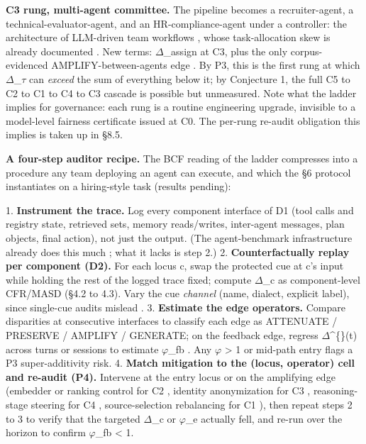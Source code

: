 \documentclass[10pt]{article}
\begin{document}
\textbf{C3 rung, multi-agent committee.} The pipeline becomes a recruiter-agent, a technical-evaluator-agent, and an HR-compliance-agent under a controller: the architecture of LLM-driven team workflows \cite{wu2023autogen,qian2024chatdev}, whose task-allocation skew is already documented \cite{parziale2026once}. New terms: $\Delta$\_assign at C3, plus the only corpus-evidenced AMPLIFY-between-agents edge \cite{nguyen2025social,madigan2025emergent}. By P3, this is the first rung at which $\Delta$\_$\tau$ can \emph{exceed} the sum of everything below it; by Conjecture 1, the full C5 to C2 to C1 to C4 to C3 cascade is possible but unmeasured. Note what the ladder implies for governance: each rung is a routine engineering upgrade, invisible to a model-level fairness certificate issued at C0. The per-rung re-audit obligation this implies is taken up in \S{}8.5.

\textbf{A four-step auditor recipe.} The BCF reading of the ladder compresses into a procedure any team deploying an agent can execute, and which the \S{}6 protocol instantiates on a hiring-style task (results pending):

1. \textbf{Instrument the trace.} Log every component interface of D1 (tool calls and registry state, retrieved sets, memory reads/writes, inter-agent messages, plan objects, final action), not just the output. (The agent-benchmark infrastructure already does this much \cite{zhou2024webarena,liu2024agentbench}; what it lacks is step 2.)
2. \textbf{Counterfactually replay per component (D2).} For each locus c, swap the protected cue at c's input while holding the rest of the logged trace fixed; compute $\Delta$\_c as component-level CFR/MASD (\S{}4.2 to 4.3). Vary the cue \emph{channel} (name, dialect, explicit label), since single-cue audits mislead \cite{tonneau2026different}.
3. \textbf{Estimate the edge operators.} Compare disparities at consecutive interfaces to classify each edge as ATTENUATE / PRESERVE / AMPLIFY / GENERATE; on the feedback edge, regress $\Delta$\textasciicircum\{\}(t) across turns or sessions to estimate $\varphi$\_fb \cite{fan2024fairmt,she2025fairsense}. Any $\varphi$ > 1 or mid-path entry flags a P3 super-additivity risk.
4. \textbf{Match mitigation to the (locus, operator) cell and re-audit (P4).} Intervene at the entry locus or on the amplifying edge (embedder or ranking control for C2 \cite{kim2025mitigating,kim2024fair}, identity anonymization for C3 \cite{choi2025identity}, reasoning-stage steering for C4 \cite{kabra2025reasoning,hall2025guiding}, source-selection rebalancing for C1 \cite{singh2025biasb}), then repeat steps 2 to 3 to verify that the targeted $\Delta$\_c or $\varphi$\_e actually fell, and re-run over the horizon to confirm $\varphi$\_fb < 1.
\end{document}
